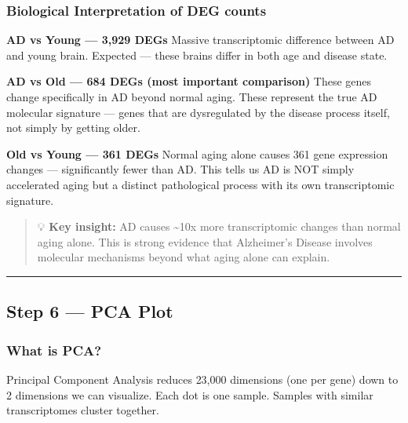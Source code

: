 \documentclass[
]{article}
\begin{document}
\subsubsection{Biological Interpretation of DEG
counts}\label{biological-interpretation-of-deg-counts}

\textbf{AD vs Young --- 3,929 DEGs} Massive transcriptomic difference
between AD and young brain. Expected --- these brains differ in both age
and disease state.

\textbf{AD vs Old --- 684 DEGs (most important comparison)} These genes
change specifically in AD beyond normal aging. These represent the true
AD molecular signature --- genes that are dysregulated by the disease
process itself, not simply by getting older.

\textbf{Old vs Young --- 361 DEGs} Normal aging alone causes 361 gene
expression changes --- significantly fewer than AD. This tells us AD is
NOT simply accelerated aging but a distinct pathological process with
its own transcriptomic signature.

\begin{quote}
💡 \textbf{Key insight:} AD causes \textasciitilde10x more
transcriptomic changes than normal aging alone. This is strong evidence
that Alzheimer's Disease involves molecular mechanisms beyond what aging
alone can explain.
\end{quote}

\begin{center}\rule{0.5\linewidth}{0.5pt}\end{center}

\subsection{Step 6 --- PCA Plot}\label{step-6-pca-plot}

\subsubsection{What is PCA?}\label{what-is-pca}

Principal Component Analysis reduces 23,000 dimensions (one per gene)
down to 2 dimensions we can visualize. Each dot is one sample. Samples
with similar transcriptomes cluster together.
\end{document}
